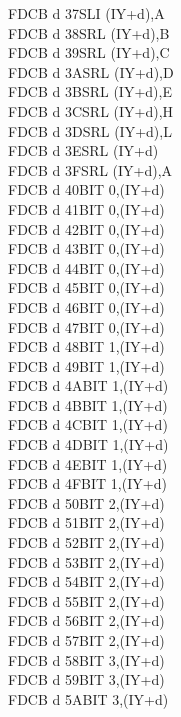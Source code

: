 \documentclass[12pt,twoside,openright,a4paper]{book}
\begin{document}
\begin{multicols}{3}
{\begin{tabbing}
	FDCB d 37\>SLI (IY+d),A\UNDOC\\
	FDCB d 38\>SRL (IY+d),B\UNDOC\\
	FDCB d 39\>SRL (IY+d),C\UNDOC\\
	FDCB d 3A\>SRL (IY+d),D\UNDOC\\
	FDCB d 3B\>SRL (IY+d),E\UNDOC\\
	FDCB d 3C\>SRL (IY+d),H\UNDOC\\
	FDCB d 3D\>SRL (IY+d),L\UNDOC\\
	FDCB d 3E\>SRL (IY+d)\\
	FDCB d 3F\>SRL (IY+d),A\UNDOC\\
	FDCB d 40\>BIT 0,(IY+d)\UNDOC\\
	FDCB d 41\>BIT 0,(IY+d)\UNDOC\\
	FDCB d 42\>BIT 0,(IY+d)\UNDOC\\
	FDCB d 43\>BIT 0,(IY+d)\UNDOC\\
	FDCB d 44\>BIT 0,(IY+d)\UNDOC\\
	FDCB d 45\>BIT 0,(IY+d)\UNDOC\\
	FDCB d 46\>BIT 0,(IY+d)\\
	FDCB d 47\>BIT 0,(IY+d)\UNDOC\\
	FDCB d 48\>BIT 1,(IY+d)\UNDOC\\
	FDCB d 49\>BIT 1,(IY+d)\UNDOC\\
	FDCB d 4A\>BIT 1,(IY+d)\UNDOC\\
	FDCB d 4B\>BIT 1,(IY+d)\UNDOC\\
	FDCB d 4C\>BIT 1,(IY+d)\UNDOC\\
	FDCB d 4D\>BIT 1,(IY+d)\UNDOC\\
	FDCB d 4E\>BIT 1,(IY+d)\\
	FDCB d 4F\>BIT 1,(IY+d)\UNDOC\\
	FDCB d 50\>BIT 2,(IY+d)\UNDOC\\
	FDCB d 51\>BIT 2,(IY+d)\UNDOC\\
	FDCB d 52\>BIT 2,(IY+d)\UNDOC\\
	FDCB d 53\>BIT 2,(IY+d)\UNDOC\\
	FDCB d 54\>BIT 2,(IY+d)\UNDOC\\
	FDCB d 55\>BIT 2,(IY+d)\UNDOC\\
	FDCB d 56\>BIT 2,(IY+d)\\
	FDCB d 57\>BIT 2,(IY+d)\UNDOC\\
	FDCB d 58\>BIT 3,(IY+d)\UNDOC\\
	FDCB d 59\>BIT 3,(IY+d)\UNDOC\\
	FDCB d 5A\>BIT 3,(IY+d)\UNDOC\\

\end{tabbing}}
\end{multicols}
\end{document}
